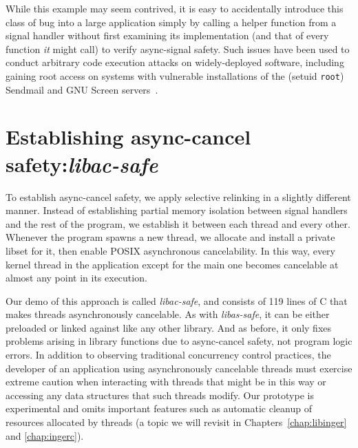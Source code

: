 While this example may seem contrived, it is easy to accidentally introduce this
class of bug into a large application simply by calling a helper function from a
signal handler without first examining its implementation (and that of every function
\textit{it} might call) to verify async-signal safety.  Such issues have been used to
conduct arbitrary code execution attacks on widely-deployed software, including
gaining root access on systems with vulnerable installations of the (setuid
\texttt{root}) Sendmail and GNU Screen servers~\cite{www-signals-fun-profit}.


\section{Establishing async-cancel safety:\@ \textit{libac-safe}}
\label{sec:safety:acsafe}

To establish async-cancel safety, we apply selective relinking in a
slightly different manner.  Instead of establishing partial memory isolation between
signal handlers and the rest of the program, we establish it between each thread and
every other.  Whenever the program spawns a new thread, we allocate and install a
private libset for it, then enable POSIX asynchronous cancelability.  In this way,
every kernel thread in the application except for the main one becomes cancelable at
almost any point in its execution.

Our demo of this approach is called \textit{libac-safe}, and consists of 119 lines of
C that makes threads asynchronously cancelable.  As with \textit{libas-safe}, it can
be either preloaded or linked against like any other library.  And as before, it only
fixes problems arising in library functions due to async-cancel safety, not program
logic errors.  In addition to observing traditional concurrency control practices,
the developer of an application using asynchronously cancelable threads must exercise
extreme caution when interacting with threads that might be  in this way
or accessing any data structures that such threads modify.  Our prototype is
experimental and omits important features such as automatic cleanup of resources
allocated by  threads (a topic we will revisit in
Chapters~\ref{chap:libinger} and \ref{chap:ingerc}).


